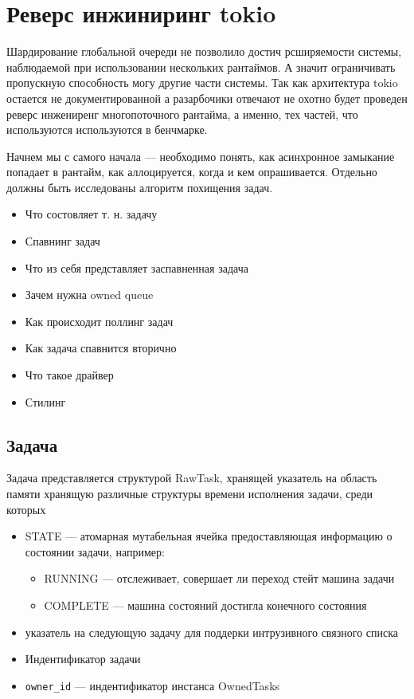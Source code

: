 
\section{Реверс инжиниринг tokio}

Шардирование глобальной очереди не позволило достич рсширяемости системы, наблюдаемой при использовании нескольких рантаймов. А значит ограничивать пропускную способность могу другие части системы. Так как архитектура tokio остается не документированной а разарбочики отвечают не охотно будет проведен реверс инжениренг многопоточного рантайма, а именно, тех частей, что используются используются в бенчмарке.

Начнем мы с самого начала --- необходимо понять, как асинхронное замыкание попадает в рантайм, как аллоцируется, когда и кем опрашивается. Отдельно должны быть исследованы алгоритм похищения задач.

\begin{itemize}
    \item Что состовляет т. н. задачу
    \item Спавнинг задач
    \item Что из себя представляет заспавненная задача
    \item Зачем нужна owned queue
    \item Как происходит поллинг задач
    \item Как задача спавнится вторично
    \item Что такое драйвер
    \item Стилинг
\end{itemize}

\subsection{Задача}

Задача представляется структурой RawTask, хранящей указатель на область памяти хранящую различные структуры времени исполнения задачи, среди которых

\begin{itemize}
    \item STATE --- атомарная мутабельная ячейка предоставляющая информацию о состоянии задачи, например:
        \begin{itemize}
            \item RUNNING --- отслеживает, совершает ли переход стейт машина задачи
            \item COMPLETE --- машина состояний достигла конечного состояния
        \end{itemize}
    \item указатель на следующую задачу для поддерки интрузивного связного списка
    \item Индентификатор задачи
    \item \verb|owner_id| --- индентификатор инстанса OwnedTasks
\end{itemize}

